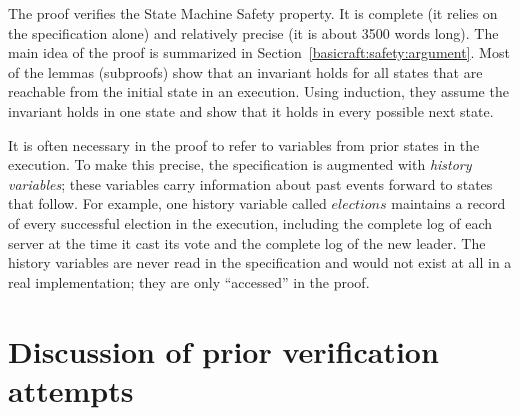The proof verifies the State Machine
Safety property. It is complete (it relies on the specification alone)
and relatively precise (it is about \num{3500} words long). The main idea
of the proof is summarized in Section~\ref{basicraft:safety:argument}.
Most of the lemmas (subproofs) show that an invariant holds for all states that
are reachable from the initial state in an execution. Using induction,
they assume the invariant holds in one state and show that it holds in
every possible next state.

It is often necessary in the proof to refer to variables from prior
states in the execution. To make this precise, the specification is
augmented with {\em history variables}; these variables carry
information about past events forward to states that follow. For
example, one history variable called $elections$ maintains a record of
every successful election in the execution, including the complete log
of each server at the time it cast its vote and the complete log of the
new leader. The history variables are never read in the specification
and would not exist at all in a real implementation; they are only
``accessed'' in the proof.

\section{Discussion of prior verification attempts}
\label{correctness:prior}

